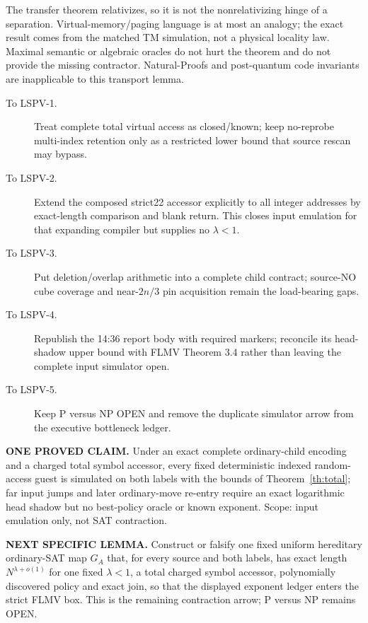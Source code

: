 \documentclass[11pt]{article}
\begin{document}
The transfer theorem relativizes, so it is not the nonrelativizing hinge of a separation. Virtual-memory/paging language is at most an analogy; the exact result comes from the matched TM simulation, not a physical locality law. Maximal semantic or algebraic oracles do not hurt the theorem and do not provide the missing contractor. Natural-Proofs and post-quantum code invariants are inapplicable to this transport lemma.

\begin{description}
\item[To LSPV-1.] Treat complete total virtual access as closed/known; keep no-reprobe multi-index retention only as a restricted lower bound that source rescan may bypass.
\item[To LSPV-2.] Extend the composed strict22 accessor explicitly to all integer addresses by exact-length comparison and blank return. This closes input emulation for that expanding compiler but supplies no $\lambda<1$.
\item[To LSPV-3.] Put deletion/overlap arithmetic into a complete child contract; source-NO cube coverage and near-$2n/3$ pin acquisition remain the load-bearing gaps.
\item[To LSPV-4.] Republish the 14:36 report body with required markers; reconcile its head-shadow upper bound with FLMV Theorem 3.4 rather than leaving the complete input simulator open.
\item[To LSPV-5.] Keep P versus NP OPEN and remove the duplicate simulator arrow from the executive bottleneck ledger.
\end{description}

\textbf{ONE PROVED CLAIM.} Under an exact complete ordinary-child encoding and a charged total symbol accessor, every fixed deterministic indexed random-access guest is simulated on both labels with the bounds of Theorem~\ref{th:total}; far input jumps and later ordinary-move re-entry require an exact logarithmic head shadow but no best-policy oracle or known exponent. Scope: input emulation only, not SAT contraction.

\textbf{NEXT SPECIFIC LEMMA.} Construct or falsify one fixed uniform hereditary ordinary-SAT map $G_A$ that, for every source and both labels, has exact length $N^{\lambda+o(1)}$ for one fixed $\lambda<1$, a total charged symbol accessor, polynomially discovered policy and exact join, so that the displayed exponent ledger enters the strict FLMV box. This is the remaining contraction arrow; P versus NP remains OPEN.
\end{document}
